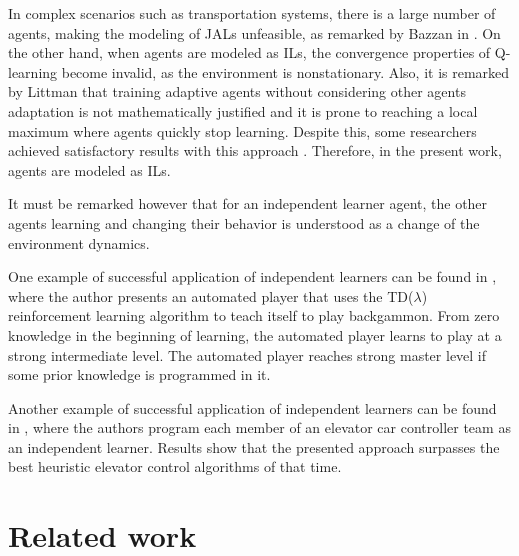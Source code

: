 \documentclass{RITA}
\begin{document}
In complex scenarios such as transportation systems, there is a large number of agents, making the modeling of JALs unfeasible, as remarked by Bazzan in \cite{Bazzan2009}. On the other hand, when agents are modeled as ILs, the convergence properties of Q-learning become invalid, as the environment is nonstationary. Also, it is remarked by Littman \cite{Littman1994} that training adaptive agents without considering other agents adaptation is not mathematically justified and it is prone to reaching a local maximum where agents quickly stop learning. Despite this, some researchers achieved satisfactory results with this approach \cite{Littman1994}. Therefore, in the present work, agents are modeled as ILs.

It must be remarked however that for an independent learner agent, the other agents learning and changing their behavior is understood as a change of the environment dynamics.  %

One example of successful application of independent learners can be found in \cite{Tesauro1994}, where the author presents an automated player that uses the TD($\lambda$) reinforcement learning algorithm \cite{Sutton1988} to teach itself to play backgammon. From zero knowledge in the beginning of learning, the automated player learns to play at a strong intermediate level. The automated player reaches strong master level if some prior knowledge is programmed in it. 

Another example of successful application of independent learners can be found in \cite{Crites&Barto1998}, where the authors program each member of an elevator car controller team as an independent learner. Results show that the presented approach surpasses the best heuristic elevator control algorithms of that time.




\section{Related work}
\label{sec:related}
\end{document}

